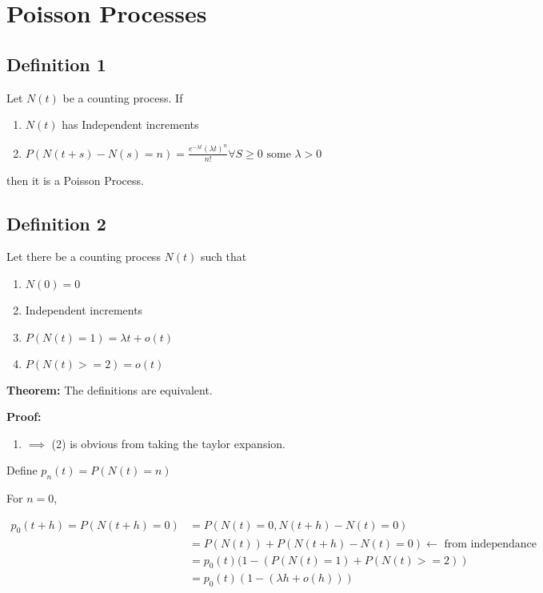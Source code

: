 \hypertarget{poisson-processes}{%
\section{Poisson Processes}\label{poisson-processes}}

\hypertarget{definition-1}{%
\subsection{Definition 1}\label{definition-1}}

Let \(N(t)\) be a counting process. If

\begin{enumerate}
\def\labelenumi{\arabic{enumi}.}
\tightlist
\item
  \(N(t)\) has Independent increments
\item
  \(P(N(t+s) - N(s) = n) = \frac{e^{-\lambda t} (\lambda t)^n}{n!} \forall S \ge 0 \text{ some } \lambda > 0\)
\end{enumerate}

then it is a Poisson Process.

\hypertarget{definition-2}{%
\subsection{Definition 2}\label{definition-2}}

Let there be a counting process \(N(t)\) such that

\begin{enumerate}
\def\labelenumi{\arabic{enumi}.}
\tightlist
\item
  \(N(0) = 0\)
\item
  Independent increments
\item
  \(P(N(t) = 1) = \lambda t + o(t)\)
\item
  \(P(N(t) >= 2) = o(t)\)
\end{enumerate}

\textbf{Theorem:} The definitions are equivalent.

\textbf{Proof:}

\begin{enumerate}
\def\labelenumi{(\arabic{enumi})}
\tightlist
\item
  \(\implies\) (2) is obvious from taking the taylor expansion.
\end{enumerate}

Define \(p_n(t) = P(N(t) = n)\)

For \(n = 0\),

\[\begin{aligned}
p_0(t+h) = P(N(t+h) = 0) &= P(N(t) = 0, N(t+h) - N(t) = 0)\\
&= P(N(t)) + P(N(t+h) - N(t) = 0) \leftarrow \text{  from independance}\\
&= p_0(t)(1 - (P(N(t)=1) + P(N(t) >= 2))\\
&= p_0(t)(1 - (\lambda h + o(h)))\\
\end{aligned}\]

